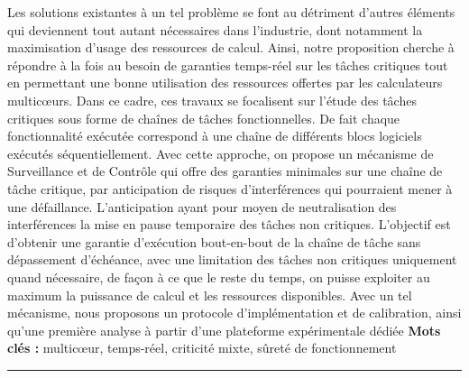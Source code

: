 \documentclass[french, a4paper, 11pt, twoside, pdftex]{StyleThese}
\begin{document}
\begin{vcenterpage}
{		Les solutions existantes à un tel problème se font au détriment d'autres éléments qui deviennent tout autant nécessaires dans l'industrie, dont notamment la maximisation d'usage des ressources de calcul. Ainsi, notre proposition cherche à répondre à la fois au besoin de garanties temps-réel sur les tâches critiques tout en permettant une bonne utilisation des ressources offertes par les calculateurs multicœurs. Dans ce cadre, ces travaux se focalisent sur l'étude des tâches critiques sous forme de chaînes de tâches fonctionnelles. De fait chaque fonctionnalité exécutée correspond à une chaîne de différents blocs logiciels exécutés séquentiellement. Avec cette approche, on propose un mécanisme de Surveillance et de Contrôle qui offre des garanties minimales sur une chaîne de tâche critique, par anticipation de risques d'interférences qui pourraient mener à une défaillance. L'anticipation ayant pour moyen de neutralisation des interférences la mise en pause temporaire des tâches non critiques. L'objectif est d'obtenir une garantie d'exécution bout-en-bout de la chaîne de tâche sans dépassement d'échéance, avec une limitation des tâches non critiques uniquement quand nécessaire, de façon à ce que le reste du temps, on puisse exploiter au maximum la puissance de calcul et les ressources disponibles. Avec un tel mécanisme, nous proposons un protocole d'implémentation et de calibration, ainsi qu'une première analyse à partir d'une plateforme expérimentale dédiée
	}
\smallbreak
{\large\textbf{Mots clés :} multicœur, temps-réel, criticité mixte, sûreté de fonctionnement}
\\
\noindent\rule[2pt]{\textwidth}{0.5pt}
\end{vcenterpage}

\newpage
\end{document}
